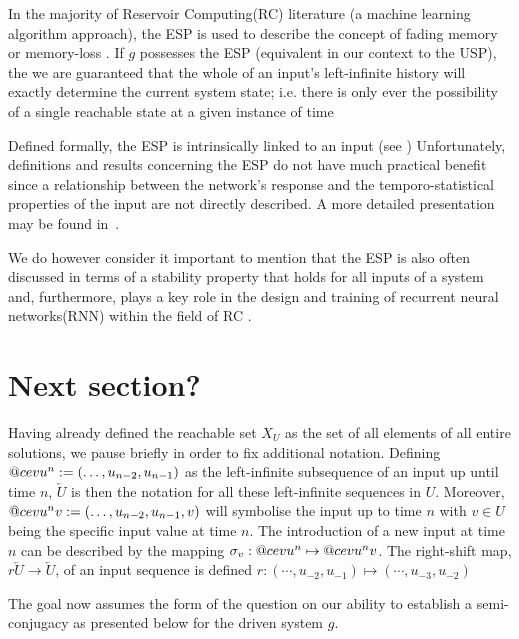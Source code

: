 \documentclass[a4paper,12pt,twoside]{report}
\makeatletter
\DeclareRobustCommand{\cev}[1]{%
  \mathpalette\do@cev{#1}%
}
\newcommand{\do@cev}[2]{%
  \fix@cev{#1}{+}%
  \reflectbox{$\m@th#1\vec{\reflectbox{$\fix@cev{#1}{-}\m@th#1#2\fix@cev{#1}{+}$}}$}%
  \fix@cev{#1}{-}%
}
\newcommand{\fix@cev}[2]{%
  \ifx#1\displaystyle
    \mkern#20mu
  \else
    \ifx#1\textstyle
      \mkern#20mu
    \else
      \ifx#1\scriptstyle
        \mkern#26mu
      \else
        \mkern#26mu
      \fi
    \fi
  \fi
}
\makeatother
\begin{document}
In the majority of Reservoir Computing(RC) literature (a machine learning algorithm approach), 
the ESP is used to describe the concept of fading memory or memory-loss  \cite{jaeger2004harnessing, lu2018attractor}. 
If $g$ possesses the ESP (equivalent in our context to the USP), the we are guaranteed that the whole of an input's left-infinite history will exactly determine the current system state; i.e. there is only ever the possibility of a single reachable state at a given instance of time \cite{jaeger2001echo}

Defined formally, the ESP is intrinsically linked to an input (see \cite{Manju_ESP}) Unfortunately, definitions and results concerning the ESP do not have much practical benefit since a relationship between the network's response and the temporo-statistical properties of the input are not directly described. A more detailed presentation may be found in~\cite{jaeger2001echo}.

We do however consider it important to mention that the ESP is also often discussed in terms of a stability property that holds for all inputs of a system~\cite{manjunath2020stability} and, furthermore, plays a key role in the design and training of recurrent neural networks(RNN) within the field of RC \cite{Manju_ESP}.
 

\section{Next section?}

Having already defined the reachable set $X_U$ as the set of all elements of all entire solutions, we pause briefly in order to fix additional notation.
Defining $\cev{u}^{n}:=(\ldots,u_{n-2} ,u_{n-1})$ as the left-infinite subsequence of an input up until time $n$, $\overleftarrow{U}$ is then the notation for all these left-infinite sequences in $U$. 
Moreover, $\cev{u}^{n}v:=(\ldots,u_{n-2} ,u_{n-1}, v)$ will symbolise the input up to time $n$ with $v \in U$ being the specific input value at time $n$. 
The introduction of a new input at time $n$ can be described by the mapping $\sigma_v:   \cev{u}^{n} \mapsto \cev{u}^{n}v$. 
The right-shift map, $r\overleftarrow{U}\to\overleftarrow{U}$, of an input sequence is defined $r: (\cdots, u_{-2},u_{-1}) \mapsto(\cdots, u_{-3},u_{-2})$

The goal now assumes the form of the question on our ability to establish a semi-conjugacy as presented below for the driven system $g$. 
\end{document}
